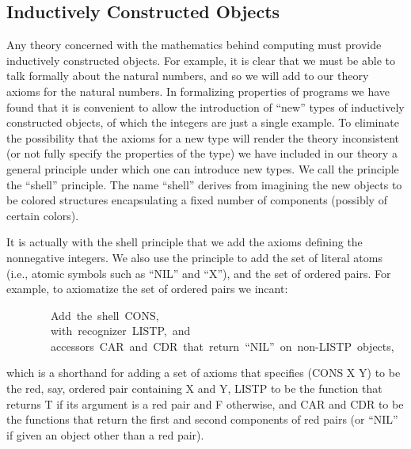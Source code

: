 \documentclass[10pt]{book}
\newenvironment{pubasis}{\begin{flushleft}}{\end{flushleft}}
\begin{document}
\subsection{Inductively Constructed Objects}
Any theory concerned with the mathematics behind computing must
provide inductively constructed objects.  For example, it is
clear that we must be able to talk formally about the
natural numbers, and so we will add to our theory axioms for the natural numbers.
In formalizing properties
of programs we have found that it is convenient to allow the introduction
of ``new''  types of inductively constructed objects, of which the integers
are just a single example.
To eliminate the possibility that the axioms
for a new type will render the theory inconsistent (or not fully
specify the properties of the type) we have included in our
theory a general principle under which one can introduce new types.
We call the principle the ``shell'' principle.  The name ``shell''
derives from imagining the new objects to be colored structures
encapsulating a fixed number of components (possibly of certain colors).

It is actually with the shell principle that we add the axioms defining
the nonnegative integers.  We also use the principle to add the set of
literal atoms (i.e., atomic symbols such as ``NIL'' and ``X''), and
the set of ordered pairs.
For example, to axiomatize the set of ordered pairs we incant:
\begin{pubasis}
~~~~~~~~Add~the~shell~CONS,\\
~~~~~~~~with~recognizer~LISTP,~and\\
~~~~~~~~accessors~CAR~and~CDR~that~return~``NIL''~on~non-LISTP~objects,\\
\end{pubasis}
which is a shorthand for adding a set of axioms that specifies (CONS X Y) to be
the red, say, ordered pair containing X and Y, LISTP to be the function that returns
T if its argument is a red pair and F otherwise, and CAR and CDR to be
the functions that return the first and second components of red
pairs (or ``NIL'' if given an object other than a red pair).
\end{document}

